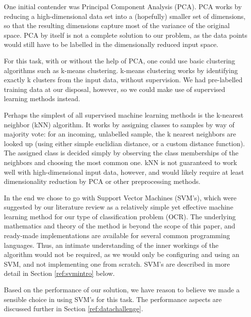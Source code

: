 \documentclass{netsec2012}
\begin{document}
One initial contender was Principal Component Analysis (PCA).  PCA works by reducing a
high-dimensional data set into a (hopefully) smaller set of dimensions, so that the resulting
dimensions capture most of the variance of the original space.  PCA by itself is not a complete
solution to our problem, as the data points would still have to be labelled in the dimensionally
reduced input space. \cite{ding2004k}

For this task, with or without the help of PCA, one could use basic clustering algorithms such as
k-means clustering.  k-means clustering works by identifying exactly k clusters from the input data,
without supervision.  We had pre-labelled training data at our disposal, however, so we could make
use of supervised learning methods instead. \cite{ding2004k}

Perhaps the simplest of all supervised machine learning methods is the k-nearest neighbor (kNN)
algorithm.  It works by assigning classes to samples by way of majority vote: for an incoming,
unlabelled sample, the k nearest neighbors are looked up (using either simple euclidian distance, or
a custom distance function).  The assigned class is decided simply by observing the class
memberships of the neighbors and choosing the most common one.  kNN is not guaranteed to work well
with high-dimensional input data, however, and would likely require at least dimensionality
reduction by PCA or other preprocessing methods. \cite{Beyer99whenis}

In the end we chose to go with Support Vector Machines (SVM's), which were suggested by our
literature review as a relatively simple yet effective machine learning method for our type of
classification problem (OCR).  The underlying mathematics and theory of the method is beyond the
scope of this paper, and ready-made implementations are available for several common programming
languages.  Thus, an intimate understanding of the inner workings of the algorithm would not be
required, as we would only be configuring and using an SVM, and not implementing one from scratch.
SVM's are described in more detail in Section \ref{ref:svmintro} below. \cite{libsvm_guide}

Based on the performance of our solution, we have reason to believe we made a sensible choice in
using SVM's for this task.  The performance aspects are discussed further in Section
\ref{ref:datachallenge}.

\end{document}
